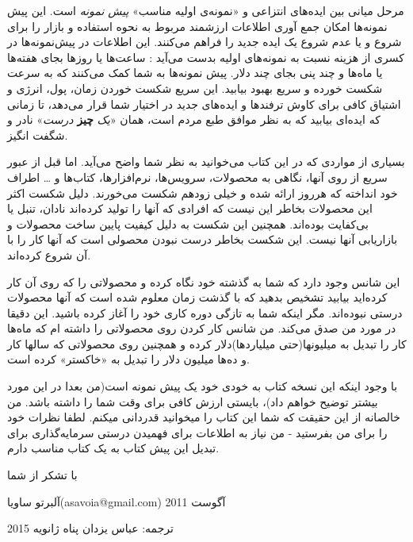 مرحل میانی بین ایده‌های انتزاعی و «نمونه‌‌ی اولیه مناسب» \emph{پیش
نمونه} است. این پیش نمونه‌ها امکان جمع آوری اطلاعات ارزشمند مربوط به
نحوه استفاده و بازار را برای شروع و یا عدم شروع یک ایده جدید را فراهم
می‌کنند. این اطلاعات در پیش‌نمونه‌ها در کسری از هزینه نسبت به نمونه‌های
اولیه بدست می‌آید : ساعت‌ها یا روزها بجای هفته‌ها یا ماه‌ها و چند پنی
بجای چند دلار. پیش نمونه‌ها به شما کمک می‌کنند که به سرعت شکست خورده و
سریع بهبود بیابید. این سریع شکست خوردن زمان، پول، انرژی و اشتیاق کافی
برای کاوش ترفند‌ها و ایده‌های جدید در اختیار شما قرار می‌دهد، تا زمانی
که ایده‌ای بیابید که به نظر موافق طبع مردم است، همان «\emph{یک}
\textbf{چیز} \emph{درست}» نادر و شگفت انگیز.

بسیاری از مواردی که در این کتاب می‌خوانید به نظر شما واضح می‌آید. اما
قبل از عبور سریع از روی آنها، نگاهی به محصولات، سرویس‌ها، نرم‌افزارها،
کتاب‌ها و \ldots{} اطراف خود انداخته که هرروز ارائه شده و خیلی زودهم
شکست می‌خورند. دلیل شکست اکثر این محصولات بخاطر این نیست که افرادی که
آنها را تولید کرده‌اند نادان، تنبل یا بی‌کفایت بوده‌اند. همچنین این شکست
به دلیل کیفیت پایین ساخت محصولات و بازاریابی آنها نیست. این شکست بخاطر
درست نبودن محصولی است که آنها کار را با آن شروع کرده‌اند.

این شانس وجود دارد که شما به گذشته خود نگاه کرده و محصولاتی را که روی آن
کار کرده‌اید بیابید تشخیص بدهید که با گذشت زمان معلوم شده است که آنها
محصولات درستی نبوده‌اند. مگر اینکه شما به تازگی دوره کاری خود را آغاز
کرده باشید. این دقیقا در مورد من صدق می‌کند. من شانس کار کردن روی
محصولاتی را داشته ام که ماه‌ها کار را تبدیل به میلیونها(حتی
میلیاردها)دلار کرده و همچنین روی محصولاتی که سالها کار و ده‌ها میلیون
دلار را تبدیل به «خاکستر» کرده است.

با وجود اینکه این نسخه کتاب به خودی خود یک پیش نمونه است(من بعدا در این
مورد بیشتر توضیح خواهم داد)، بایستی ارزش کافی برای وقت شما را داشته
باشد. من خالصانه از این حقیقت که شما این کتاب را میخوانید قدردانی میکنم.
لطفا نظرات خود را برای من بفرستید - من نیاز به اطلاعات برای فهمیدن درستی
سرمایه‌گذاری برای تبدیل این پیش کتاب به یک کتاب مناسب دارم.

با تشکر از شما

آلبرتو ساویا(asavoia@gmail.com) آگوست 2011

ترجمه: عباس یزدان پناه ژانویه 2015
